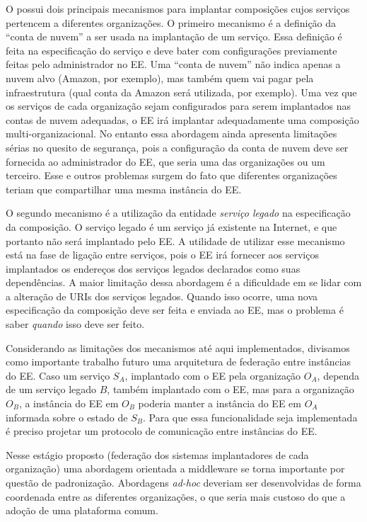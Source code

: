 \begin{description}
O \ee possui dois principais mecanismos para implantar composições cujos serviços
pertencem a diferentes organizações.
O primeiro mecanismo é a definição da ``conta de nuvem'' a ser usada na implantação de um serviço.
Essa definição é feita na especificação do serviço e deve bater com configurações
previamente feitas pelo administrador no EE.
Uma ``conta de nuvem'' não indica apenas a nuvem alvo (Amazon, por exemplo),
mas também quem vai pagar pela infraestrutura (qual conta da Amazon será utilizada, por exemplo).
Uma vez que os serviços de cada organização sejam configurados para serem implantados
nas contas de nuvem adequadas, o EE irá implantar adequadamente uma composição
multi-organizacional.
No entanto essa abordagem ainda apresenta limitações sérias no quesito de segurança,
pois a configuração da conta de nuvem deve ser fornecida ao administrador do EE,
que seria uma das organizações ou um terceiro.
Esse e outros problemas surgem do fato que diferentes organizações teriam que
compartilhar uma mesma instância do EE.

O segundo mecanismo é a utilização da entidade \emph{serviço legado} na especificação da composição.
O serviço legado é um serviço já existente na Internet, e que portanto
não será implantado pelo EE.
A utilidade de utilizar esse mecanismo está na fase de ligação
entre serviços, pois o EE irá fornecer
aos serviços implantados os endereços dos serviços legados declarados como suas dependências.
A maior limitação dessa abordagem é a dificuldade em se lidar com a alteração de URIs
dos serviços legados.
Quando isso ocorre, uma nova especificação da composição deve ser feita e enviada ao EE,
mas o problema é saber \emph{quando} isso deve ser feito.

Considerando as limitações dos mecanismos até aqui implementados,
divisamos como importante trabalho futuro uma arquitetura de federação entre instâncias do EE.
Caso um serviço $S_A$, implantado com o EE pela organização $O_A$, dependa de um serviço legado $B$,
também implantado com o EE, mas para a organização $O_B$, a instância do EE em $O_B$ poderia
manter a instância do EE em $O_A$ informada sobre o estado de $S_B$.
Para que essa funcionalidade seja implementada é preciso projetar um protocolo
de comunicação entre instâncias do EE.

Nesse estágio proposto (federação dos sistemas implantadores de cada organização) uma abordagem
orientada a middleware se torna importante por questão de padronização.
Abordagens \emph{ad-hoc} deveriam ser desenvolvidas de forma coordenada entre as diferentes organizações,
o que seria mais custoso do que a adoção de uma plataforma comum.


\end{description}
